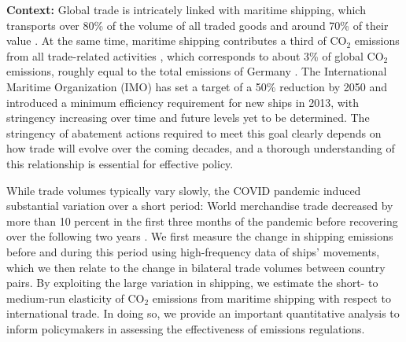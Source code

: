 \documentclass[hidelinks, 12pt,letterpaper]{article}
\begin{document}
\noindent \textbf{Context:} 
Global trade is intricately linked with maritime shipping, which transports over 80\% of the volume of all traded goods and around 70\% of their value .
At the same time, maritime shipping contributes a third of CO$_2$ emissions from all trade-related activities \citep{shapiro2016trade}, which corresponds to
about 3\% of global CO$_2$ emissions, roughly equal to the total emissions of Germany \citep{faber2020fourth}. The International Maritime Organization (IMO) has set a target of a 50\% reduction by 2050 and introduced a minimum efficiency requirement for new ships in 2013, with stringency increasing over time and future levels yet to be determined.    %
The stringency of abatement actions required to meet this goal clearly depends on how trade will evolve over the coming decades, and a thorough understanding of this relationship is essential for effective policy.  %



While trade volumes typically vary slowly, the COVID pandemic induced substantial variation over a short period:
World merchandise trade decreased by more than 10 percent in the first three months of the pandemic before recovering over the following two years \citep{oecd21}. %
We first measure the change in shipping emissions before and during this period using high-frequency data of ships' movements, which we then relate to the change in bilateral trade volumes between country pairs. By exploiting the large variation in shipping, we estimate the short- to medium-run elasticity of CO$_2$ emissions from maritime shipping with respect to international trade. In doing so, we provide an
important quantitative analysis to inform policymakers in assessing the effectiveness of emissions regulations.  %
\end{document}
